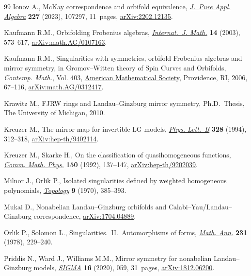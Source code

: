 \documentclass[pdftex]{sigma}
\numberwithin{equation}{section}
\begin{document}
\begin{thebibliography}{99}
Ionov A., Mc{K}ay correspondence and orbifold equivalence, \href{https://doi.org/10.1016/j.jpaa.2022.107297}{\textit{J.~Pure
 Appl. Algebra}} \textbf{227} (2023), 107297, 11~pages, \href{https://arxiv.org/abs/2202.12135}{arXiv:2202.12135}.

Kaufmann R.M., Orbifolding {F}robenius algebras, \href{https://doi.org/10.1142/S0129167X03001831}{\textit{Internat.~J. Math.}}
 \textbf{14} (2003), 573--617, \href{https://arxiv.org/abs/math.AG/0107163}{arXiv:math.AG/0107163}.

Kaufmann R.M., Singularities with symmetries, orbifold {F}robenius algebras and
 mirror symmetry, in Gro\-mov--{W}itten theory of {S}pin {C}urves and
 {O}rbifolds, \textit{Contemp. Math.}, Vol. 403, \href{https://doi.org/10.1090/conm/403/07596}{American Mathematical
 Society}, Providence, RI, 2006, 67--116, \href{https://arxiv.org/abs/math.AG/0312417}{arXiv:math.AG/0312417}.

Krawitz M., F{JRW} rings and {L}andau--{G}inzburg mirror symmetry, Ph.D.~Thesis, {T}he {U}niversity of {M}ichigan, 2010.

Kreuzer M., The mirror map for invertible {LG} models, \href{https://doi.org/10.1016/0370-2693(94)91485-0}{\textit{Phys. Lett.~B}}
 \textbf{328} (1994), 312--318, \href{https://arxiv.org/abs/hep-th/9402114}{arXiv:hep-th/9402114}.

Kreuzer M., Skarke H., On the classification of quasihomogeneous functions,
 \href{https://doi.org/10.1007/BF02096569}{\textit{Comm. Math. Phys.}} \textbf{150} (1992), 137--147,
 \href{https://arxiv.org/abs/hep-th/9202039}{arXiv:hep-th/9202039}.

Milnor J., Orlik P., Isolated singularities defined by weighted homogeneous
 polynomials, \href{https://doi.org/10.1016/0040-9383(70)90061-3}{\textit{Topology}} \textbf{9} (1970), 385--393.

Mukai D., Nonabelian {L}andau--{G}inzburg orbifolds and
 {C}alabi--{Y}au/{L}andau--{G}inzburg correspondence, \href{https://arxiv.org/abs/1704.04889}{arXiv:1704.04889}.

Orlik P., Solomon L., Singularities.~{II}.~{A}utomorphisms of forms,
 \href{https://doi.org/10.1007/BF01420243}{\textit{Math. Ann.}} \textbf{231} (1978), 229--240.

Priddis N., Ward J., Williams M.M., Mirror symmetry for nonabelian
 {L}andau--{G}inzburg models, \href{https://doi.org/10.3842/SIGMA.2020.059}{\textit{SIGMA}} \textbf{16} (2020), 059,
 31~pages, \href{https://arxiv.org/abs/1812.06200}{arXiv:1812.06200}.


\end{thebibliography}
\end{document}
